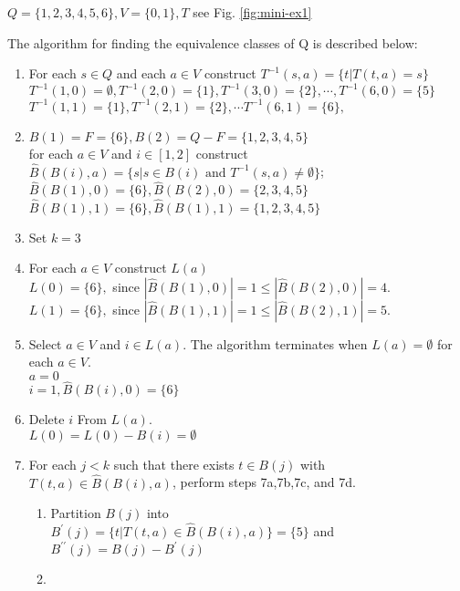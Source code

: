 \begin{example}
	$Q=\{1,2,3,4,5,6\},V=\{0,1\},T $ see Fig. \ref{fig:mini-ex1}
	
	The algorithm for finding the equivalence classes of Q is described below: 
	\begin{enumerate}[Step 1. ]
		\item For each $s\in Q$ and each $a\in V$ construct   $T^{-1}(s,a)=\{t|T(t,a)=s\}$\\
			$T^{-1}(1,0)=\emptyset,T^{-1}(2,0)=\{1\},T^{-1}(3,0)=\{2\},\cdots,T^{-1}(6,0)=\{5\}$\\
			$T^{-1}(1,1)=\{1\},T^{-1}(2,1)=\{2\},\cdots T^{-1}(6,1)=\{6\},$
		\item $B(1)=F=\{6\},B(2)=Q-F=\{1,2,3,4,5\}$\\
			for each $a\in V$ and $i\in[1,2]$ construct  $\hat{B}(B(i),a)=\{s|s\in B(i) \text{ and } T^{-1}(s,a)\ne \emptyset\}$;\\
			$\hat{B}(B(1),0)=\{6\},\hat{B}(B(2),0)=\{2,3,4,5\}$ \\
			$\hat{B}(B(1),1)=\{6\},\hat{B}(B(1),1)=\{1,2,3,4,5\}$ \\
		\item Set $k=3$
		\item For each $a\in V$ construct $L(a)$ \\
			$L(0) = \{6\},$ \qquad since $|\hat{B}(B(1),0)|=1\le |\hat{B}(B(2),0)|=4$.\\
			$L(1) = \{6\},$ \qquad since $|\hat{B}(B(1),1)|=1\le |\hat{B}(B(2),1)|=5$.
		\item Select $a\in V$ and $i\in L(a)$. The algorithm terminates when $L(a)=\emptyset$ for each $a\in V$.\\
		    $a=0$\\
		    $i=1,\hat{B}(B(i),0)=\{6\}$
		\item Delete $i$ From $L(a)$.\\
			$L(0)=L(0)-B(i)=\emptyset$
		\item For each $j<k$ such that there exists $t\in B(j)$ with $T(t,a)\in \hat{B}(B(i),a)$, perform steps 7a,7b,7c, and 7d. 
			\begin{enumerate}[Step 7a. ]
				\item Partition $B(j)$ into\\ 
					$B^\prime(j)=\{t|T(t,a)\in \hat{B}(B(i),a)\}=\{5\}$ and\\			
				    $B^{\prime\prime}(j)=B(j)-B^\prime(j)$\\
				\item
			\end{enumerate}
	\end{enumerate}  
\end{example}

